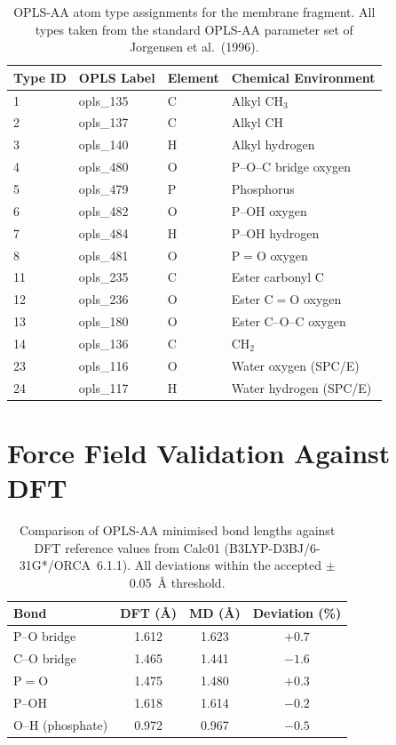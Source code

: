 \documentclass[12pt,a4paper]{report}
\begin{document}
\begin{table}[h]
\centering
\caption{OPLS-AA atom type assignments for the membrane 
fragment. All types taken from the standard OPLS-AA 
parameter set of Jorgensen et al.\ (1996).}
\label{tab:opls-types}
\begin{tabular}{llll}
\toprule
Type ID & OPLS Label & Element & Chemical Environment \\
\midrule
1  & opls\_135 & C & Alkyl CH\(_3\) \\
2  & opls\_137 & C & Alkyl CH \\
3  & opls\_140 & H & Alkyl hydrogen \\
4  & opls\_480 & O & P--O--C bridge oxygen \\
5  & opls\_479 & P & Phosphorus \\
6  & opls\_482 & O & P--OH oxygen \\
7  & opls\_484 & H & P--OH hydrogen \\
8  & opls\_481 & O & P\(=\)O oxygen \\
11 & opls\_235 & C & Ester carbonyl C \\
12 & opls\_236 & O & Ester C\(=\)O oxygen \\
13 & opls\_180 & O & Ester C--O--C oxygen \\
14 & opls\_136 & C & CH\(_2\) \\
23 & opls\_116 & O & Water oxygen (SPC/E) \\
24 & opls\_117 & H & Water hydrogen (SPC/E) \\
\bottomrule
\end{tabular}
\end{table}

\section{Force Field Validation Against DFT}

\begin{table}[h]
\centering
\caption{Comparison of OPLS-AA minimised bond lengths against 
DFT reference values from Calc01 (B3LYP-D3BJ/6-31G*/ORCA~6.1.1). 
All deviations within the accepted $\pm$0.05~\AA{} threshold.}
\label{tab:ff-validation}
\begin{tabular}{lccc}
\toprule
Bond & DFT (\AA{}) & MD (\AA{}) & Deviation (\%) \\
\midrule
P--O bridge & 1.612 & 1.623 & $+0.7$ \\
C--O bridge & 1.465 & 1.441 & $-1.6$ \\
P\(=\)O     & 1.475 & 1.480 & $+0.3$ \\
P--OH       & 1.618 & 1.614 & $-0.2$ \\
O--H (phosphate) & 0.972 & 0.967 & $-0.5$ \\
\bottomrule
\end{tabular}
\end{table}
\end{document}

